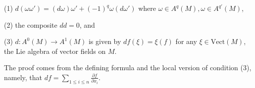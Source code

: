 (1) $d(\omega \omega') = (d\omega)\omega' + (-1)^q\omega(d\omega')$ where $\omega \in A^q(M), \omega \in A^{q'}(M)$,

(2) the composite $dd = 0$, and

(3) $d: A^0(M) \rightarrow A^1(M)$ is given by $df(\xi) = \xi(f)$ for any $\xi \in \text{Vect}(M)$, the Lie algebra of vector fields on $M$.

The proof comes from the defining formula and the local version of condition (3), namely, that $df = \sum_{1 \leq i \leq n} \frac{\partial f}{\partial x_i}$.
